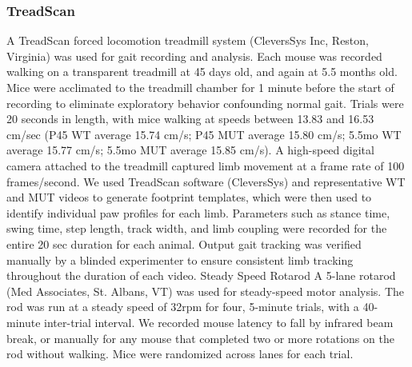\subsubsection{TreadScan}
A TreadScan forced locomotion treadmill
system (CleversSys Inc, Reston, Virginia) was used for gait recording and
analysis. Each mouse was recorded walking on a transparent treadmill at 45 days
old, and again at 5.5 months old.  Mice were acclimated to the treadmill chamber
for 1 minute before the start of recording to eliminate exploratory behavior
confounding normal gait. Trials were 20 seconds in length, with mice walking at
speeds between 13.83 and 16.53 cm/sec (P45 WT average 15.74 cm/s; P45 MUT
average 15.80 cm/s; 5.5mo WT average 15.77 cm/s; 5.5mo MUT average 15.85 cm/s).
A high-speed digital camera attached to the treadmill captured limb movement at
a frame rate of 100 frames/second. We used TreadScan software (CleversSys) and
representative WT and MUT videos to generate footprint templates, which were
then used to identify individual paw profiles for each limb. Parameters such as
stance time, swing time, step length, track width, and limb coupling were
recorded for the entire 20 sec duration for each animal. Output gait tracking
was verified manually by a blinded experimenter to ensure consistent limb
tracking throughout the duration of each video.  Steady Speed Rotarod A 5-lane
rotarod (Med Associates, St. Albans, VT) was used for steady-speed motor
analysis. The rod was run at a steady speed of 32rpm for four, 5-minute trials,
with a 40-minute inter-trial interval. We recorded mouse latency to fall by
infrared beam break, or manually for any mouse that completed two or more
rotations on the rod without walking. Mice were randomized across lanes for each
trial.

